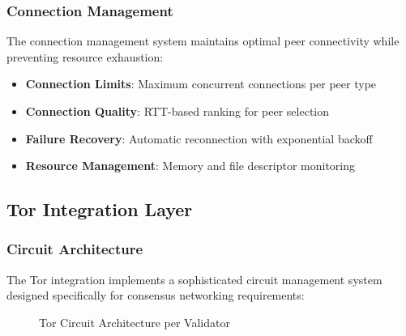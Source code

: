\documentclass[11pt,a4paper]{article}
\theoremstyle{definition}
\theoremstyle{remark}
\begin{document}
\subsubsection{Connection Management}

The connection management system maintains optimal peer connectivity while preventing resource exhaustion:

\begin{itemize}
    \item \textbf{Connection Limits}: Maximum concurrent connections per peer type
    \item \textbf{Connection Quality}: RTT-based ranking for peer selection
    \item \textbf{Failure Recovery}: Automatic reconnection with exponential backoff
    \item \textbf{Resource Management}: Memory and file descriptor monitoring
\end{itemize}

\subsection{Tor Integration Layer}

\subsubsection{Circuit Architecture}

The Tor integration implements a sophisticated circuit management system designed specifically for consensus networking requirements:

\begin{figure}[h]
\centering
{}
\caption{Tor Circuit Architecture per Validator}
\end{figure}
\end{document}
